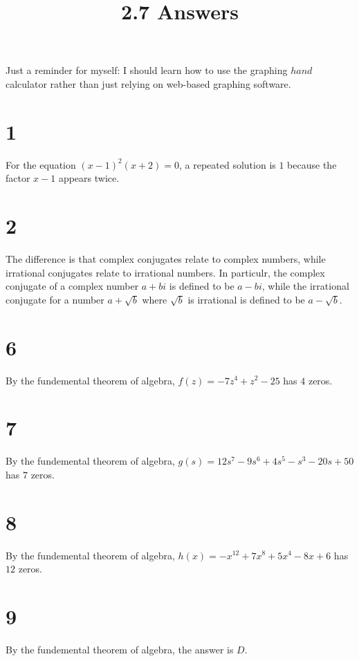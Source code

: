 \documentclass{article}
\title{2.7 Answers}
\theoremstyle{definition}
\begin{document}
\maketitle



Just a reminder for myself: I should learn how to use the graphing $hand$ calculator rather than just relying on web-based graphing software.
\section*{1}


For the equation $(x-1)^2(x+2)=0$, a repeated solution is $1$ because the factor $x-1$ appears twice.

\section*{2}


The difference is that complex conjugates relate to complex numbers, while irrational conjugates relate to irrational numbers. In particulr, the complex 
conjugate of a complex number $a+bi$ is defined to be $a-bi$, while the irrational conjugate for a number $a+\sqrt{b}$ where $\sqrt{b}$ is irrational 
is defined to be $a-\sqrt{b}$.

\section*{6}


By the fundemental theorem of algebra, $f(z)=-7z^4+z^2-25$ has $4$ zeros.

\section*{7}


By the fundemental theorem of algebra, $g(s)=12s^7-9s^6+4s^5-s^3-20s+50$ has $7$ zeros.

\section*{8}


By the fundemental theorem of algebra, $h(x)=-x^{12}+7x^8+5x^4-8x+6$ has $12$ zeros. 

\section*{9}


By the fundemental theorem of algebra, the answer is $D$.
\end{document}

